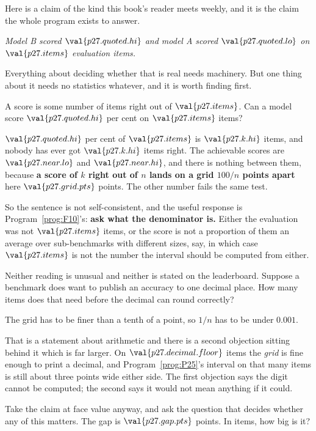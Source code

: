 \begin{fr}
Here is a claim of the kind this book's reader meets weekly, and it is the
claim the whole program exists to answer.

\begin{center}
\emph{Model B scored $\val{p27.quoted.hi}$ and model A scored
$\val{p27.quoted.lo}$ on $\val{p27.items}$ evaluation items.}
\end{center}

Everything about deciding whether that is real needs machinery. But one thing
about it needs no statistics whatever, and it is worth finding first.

A score is some number of items right out of $\val{p27.items}$. Can a model
score $\val{p27.quoted.hi}$ per cent on $\val{p27.items}$ items?
\dotline
\nextframe
\end{fr}

\begin{fr}

$\val{p27.quoted.hi}$ per cent of $\val{p27.items}$ is $\val{p27.k.hi}$
items, and nobody has ever got $\val{p27.k.hi}$ items right. The achievable
scores are $\val{p27.near.lo}$ and $\val{p27.near.hi}$, and there is nothing
between them, because \textbf{a score of $k$ right out of $n$ lands on a grid
$100/n$ points apart} \dash{} here $\val{p27.grid.pts}$ points.
The other number fails the same test.

So the sentence is not self-consistent, and the useful response is
Program~\ref{prog:F10}'s: \textbf{ask what the denominator is.} Either the
evaluation was not $\val{p27.items}$ items, or the score is not a proportion
of them \dash{} an average over sub-benchmarks with different sizes, say, in
which case $\val{p27.items}$ is not the number the interval should be
computed from either.

Neither reading is unusual and neither is stated on the leaderboard. Suppose
a benchmark does want to publish an accuracy to one decimal place. How many
items does that need before the decimal can round correctly?
\dotline
\nextframe
\end{fr}

\begin{fr}

The grid has to be finer than a tenth of a point, so $1/n$ has to be
under $\num{0.001}$.

That is a statement about arithmetic and there is a second objection sitting
behind it which is far larger. On $\val{p27.decimal.floor}$ items the
\emph{grid} is fine enough to print a decimal, and Program~\ref{prog:P25}'s
interval on that many items is still about three points wide either side. The
first objection says the digit cannot be computed; the second says it would
not mean anything if it could.

Take the claim at face value anyway, and ask the question that decides
whether any of this matters. The gap is $\val{p27.gap.pts}$ points. In items,
how big is it?
\dotline
\nextframe
\end{fr}

